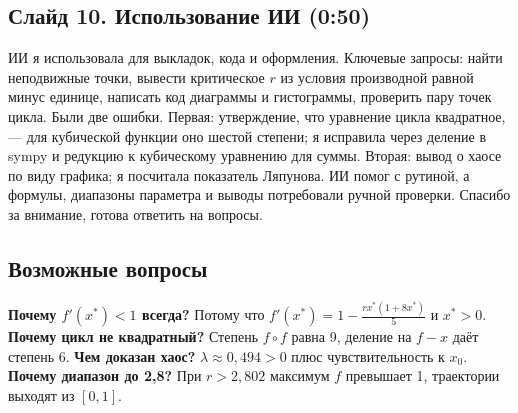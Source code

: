 \documentclass[12pt,a4paper]{article}
\begin{document}
\subsection*{Слайд 10. Использование ИИ (0:50)}
ИИ я использовала для выкладок, кода и оформления. Ключевые запросы: найти неподвижные точки, вывести критическое $r$ из условия производной равной минус единице, написать код диаграммы и гистограммы, проверить пару точек цикла. Были две ошибки. Первая: утверждение, что уравнение цикла квадратное, --- для кубической функции оно шестой степени; я исправила через деление в sympy и редукцию к кубическому уравнению для суммы. Вторая: вывод о хаосе по виду графика; я посчитала показатель Ляпунова. ИИ помог с рутиной, а формулы, диапазоны параметра и выводы потребовали ручной проверки. Спасибо за внимание, готова ответить на вопросы.

\subsection*{Возможные вопросы}
\textbf{Почему $f'(x^*)<1$ всегда?} Потому что $f'(x^*)=1-\frac{r x^*(1+8x^*)}5$ и $x^*>0$. \textbf{Почему цикл не квадратный?} Степень $f\circ f$ равна 9, деление на $f-x$ даёт степень 6. \textbf{Чем доказан хаос?} $\lambda\approx0{,}494>0$ плюс чувствительность к $x_0$. \textbf{Почему диапазон до 2,8?} При $r>2{,}802$ максимум $f$ превышает 1, траектории выходят из $[0,1]$.
\end{document}
